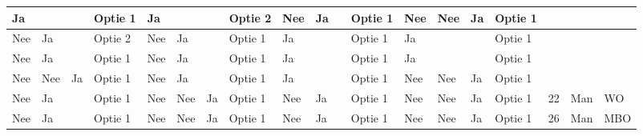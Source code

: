 \documentclass[twoside,openright]{uva-bachelor-thesis}
\begin{document}
\begin{table}
\begin{tabular}{|l|l|l|l|l|l|l|l|l|l|l|l|l|l|l|l|l|l|l|}
		Ja       &          &          & Optie 1                             & Ja       &          &          & Optie 2                             & Nee      & Ja       &          & Optie 1                             & Nee      & Nee      & Ja       & Optie 1                             &                    &                    &                                                          \\  \hline
		Nee      & Ja       &          & Optie 2                             & Nee      & Ja       &          & Optie 1                             & Ja       &          &          & Optie 1                             & Ja       &          &          & Optie 1                             &                    &                    &                                                        \\  \hline
		Nee      & Ja       &          & Optie 1                             & Nee      & Ja       &          & Optie 1                             & Ja       &          &          & Optie 1                             & Ja       &          &          & Optie 1                             &                    &                    &                                                         \\  \hline
		Nee      & Nee      & Ja       & Optie 1                             & Nee      & Ja       &          & Optie 1                             & Ja       &          &          & Optie 1                             & Nee      & Nee      & Ja       & Optie 1                             &                    &                    &                                                         \\  \hline
		Nee      & Ja       &          & Optie 1                             & Nee      & Nee      & Ja       & Optie 1                             & Nee      & Ja       &          & Optie 1                             & Nee      & Nee      & Ja       & Optie 1                             & 22                 & Man                &                             WO                           \\  \hline
		Nee      & Ja       &          & Optie 1                             & Nee      & Nee      & Ja       & Optie 1                             & Nee      & Ja       &          & Optie 1                             & Nee      & Nee      & Ja       & Optie 1                             & 26                 & Man                &                             MBO                          \\  \hline

\end{tabular}
\end{table}
\end{document}
